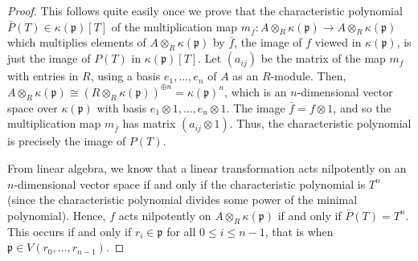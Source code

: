 \documentclass[10pt,a4paper]{amsart}
\theoremstyle{plain}
\theoremstyle{definition}
\theoremstyle{remark}
\numberwithin{equation}{subsection}
\begin{document}
\begin{proof}
This follows quite easily once we prove that the characteristic
polynomial $\bar P(T) \in \kappa(\mathfrak p)[T]$ of the
multiplication map $m_{\bar f}: A \otimes_R \kappa(\mathfrak p) \to
A \otimes_R \kappa(\mathfrak p)$ which multiplies elements of $A
\otimes_R \kappa(\mathfrak p)$ by $\bar f$, the image of $f$ viewed in
$\kappa(\mathfrak p)$, is just the image of $P(T)$ in
$\kappa(\mathfrak p)[T]$. Let $(a_{ij})$ be the matrix of the map
$m_f$ with entries in $R$, using a basis $e_1, \ldots, e_n$
of $A$ as an $R$-module.
Then, $A \otimes_R \kappa(\mathfrak p) \cong (R \otimes_R
\kappa(\mathfrak p))^{\oplus n} = \kappa(\mathfrak p)^n$, which is
an $n$-dimensional vector space over $\kappa(\mathfrak p)$ with
basis $e_1 \otimes 1, \ldots, e_n \otimes 1$. The image $\bar f = f
\otimes 1$, and so the multiplication map $m_{\bar f}$ has matrix
$(a_{ij} \otimes 1)$. Thus, the characteristic polynomial is
precisely the image of $P(T)$.

\medskip\noindent
From linear algebra, we know that a linear transformation acts
nilpotently on an $n$-dimensional vector space if and only if the
characteristic polynomial is $T^n$ (since the characteristic
polynomial divides some power of the minimal polynomial). Hence,
$f$ acts nilpotently on $A \otimes_R \kappa(\mathfrak p)$ if and
only if $\bar P(T) = T^n$. This occurs if and only if $r_i \in
\mathfrak p$ for all $0 \leq i \leq n - 1$, that is when $\mathfrak p \in
V(r_0, \ldots, r_{n - 1}).$
\end{proof}
\end{document}
